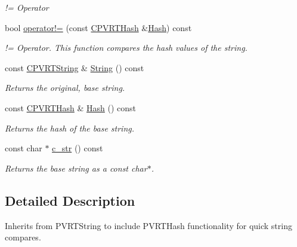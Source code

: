 \begin{DoxyCompactItemize}
\begin{DoxyCompactList}\small\item\em != Operator \end{DoxyCompactList}\item 
bool \hyperlink{class_c_p_v_r_t_string_hash_aef588d5c069ab62d902595f31cfd46fd}{operator!=} (const \hyperlink{class_c_p_v_r_t_hash}{C\+P\+V\+R\+T\+Hash} \&\hyperlink{struct_hash}{Hash}) const 
\begin{DoxyCompactList}\small\item\em != Operator. This function compares the hash values of the string. \end{DoxyCompactList}\item 
const \hyperlink{class_c_p_v_r_t_string}{C\+P\+V\+R\+T\+String} \& \hyperlink{class_c_p_v_r_t_string_hash_ab3b3b774c1cd426c81f0fe26d44a5246}{String} () const 
\begin{DoxyCompactList}\small\item\em Returns the original, base string. \end{DoxyCompactList}\item 
const \hyperlink{class_c_p_v_r_t_hash}{C\+P\+V\+R\+T\+Hash} \& \hyperlink{class_c_p_v_r_t_string_hash_af7c991da6bbffdf4381683897469cc74}{Hash} () const 
\begin{DoxyCompactList}\small\item\em Returns the hash of the base string. \end{DoxyCompactList}\item 
const char $\ast$ \hyperlink{class_c_p_v_r_t_string_hash_a4c9b83759bcb1cc6d6aff16ab1624f39}{c\+\_\+str} () const 
\begin{DoxyCompactList}\small\item\em Returns the base string as a const char$\ast$. \end{DoxyCompactList}\end{DoxyCompactItemize}


\subsection{Detailed Description}
Inherits from P\+V\+R\+T\+String to include P\+V\+R\+T\+Hash functionality for quick string compares. 



 

